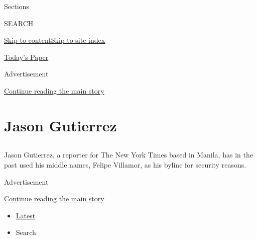 Sections

SEARCH

\protect\hyperlink{site-content}{Skip to
content}\protect\hyperlink{site-index}{Skip to site index}

\href{https://myaccount.nytimes3xbfgragh.onion/auth/login?response_type=cookie\&client_id=vi}{}

\href{https://www.nytimes3xbfgragh.onion/section/todayspaper}{Today's
Paper}

Advertisement

\protect\hyperlink{after-top}{Continue reading the main story}

\hypertarget{jason-gutierrez}{%
\section{Jason Gutierrez}\label{jason-gutierrez}}

\subsection{}

Jason Gutierrez, a reporter for The New York Times based in Manila, has
in the past used his middle names, Felipe Villamor, as his byline for
security reasons.

Advertisement

\protect\hyperlink{after-mid1}{Continue reading the main story}

\begin{itemize}
\tightlist
\item
  \protect\hyperlink{stream-panel}{Latest}
\item
  Search
\end{itemize}

